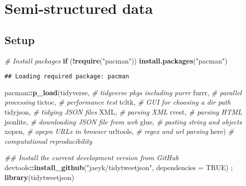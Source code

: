 \documentclass[
]{book}
\newenvironment{Shaded}{\begin{snugshade}}{\end{snugshade}}
\newcommand{\CommentTok}[1]{\textcolor[rgb]{0.56,0.35,0.01}{\textit{#1}}}
\newcommand{\ControlFlowTok}[1]{\textcolor[rgb]{0.13,0.29,0.53}{\textbf{#1}}}
\newcommand{\DataTypeTok}[1]{\textcolor[rgb]{0.13,0.29,0.53}{#1}}
\newcommand{\KeywordTok}[1]{\textcolor[rgb]{0.13,0.29,0.53}{\textbf{#1}}}
\newcommand{\NormalTok}[1]{#1}
\newcommand{\OperatorTok}[1]{\textcolor[rgb]{0.81,0.36,0.00}{\textbf{#1}}}
\newcommand{\OtherTok}[1]{\textcolor[rgb]{0.56,0.35,0.01}{#1}}
\newcommand{\StringTok}[1]{\textcolor[rgb]{0.31,0.60,0.02}{#1}}
\begin{document}
\hypertarget{semi_structured_data}{%
\chapter{Semi-structured data}\label{semi_structured_data}}

\hypertarget{setup-4}{%
\section{Setup}\label{setup-4}}

\begin{Shaded}
\begin{Highlighting}[]
\CommentTok{\# Install packages }
\ControlFlowTok{if}\NormalTok{ (}\OperatorTok{!}\KeywordTok{require}\NormalTok{(}\StringTok{"pacman"}\NormalTok{)) }\KeywordTok{install.packages}\NormalTok{(}\StringTok{"pacman"}\NormalTok{)}
\end{Highlighting}
\end{Shaded}

\begin{verbatim}
## Loading required package: pacman
\end{verbatim}

\begin{Shaded}
\begin{Highlighting}[]
\NormalTok{pacman}\OperatorTok{::}\KeywordTok{p\_load}\NormalTok{(tidyverse, }\CommentTok{\# tidyverse pkgs including purrr}
\NormalTok{               furrr, }\CommentTok{\# parallel processing }
\NormalTok{               tictoc, }\CommentTok{\# performance test  }
\NormalTok{               tcltk, }\CommentTok{\# GUI for choosing a dir path }
\NormalTok{               tidyjson, }\CommentTok{\# tidying JSON files }
\NormalTok{               XML, }\CommentTok{\# parsing XML}
\NormalTok{               rvest, }\CommentTok{\# parsing HTML}
\NormalTok{               jsonlite, }\CommentTok{\# downloading JSON file from web}
\NormalTok{               glue, }\CommentTok{\# pasting string and objects}
\NormalTok{               xopen, }\CommentTok{\# opepn URLs in browser }
\NormalTok{               urltools, }\CommentTok{\# regex and url parsing }
\NormalTok{               here) }\CommentTok{\# computational reproducibility}

\CommentTok{\#\# Install the current development version from GitHub}
\NormalTok{devtools}\OperatorTok{::}\KeywordTok{install\_github}\NormalTok{(}\StringTok{"jaeyk/tidytweetjson"}\NormalTok{, }\DataTypeTok{dependencies =} \OtherTok{TRUE}\NormalTok{) ; }\KeywordTok{library}\NormalTok{(tidytweetjson)}
\end{Highlighting}
\end{Shaded}
\end{document}
